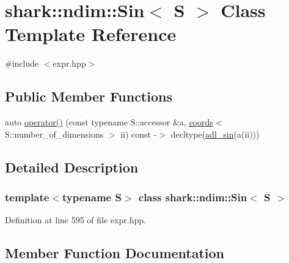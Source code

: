\hypertarget{classshark_1_1ndim_1_1_sin}{}\section{shark\+:\+:ndim\+:\+:Sin$<$ S $>$ Class Template Reference}
\label{classshark_1_1ndim_1_1_sin}


{\ttfamily \#include $<$expr.\+hpp$>$}

\subsection*{Public Member Functions}
\begin{DoxyCompactItemize}
\item 
auto \hyperlink{classshark_1_1ndim_1_1_sin_aa8853d13b3d3095ee7ca6518254399f6}{operator()} (const typename S\+::accessor \&a, \hyperlink{structshark_1_1ndim_1_1coords}{coords}$<$ S\+::number\+\_\+of\+\_\+dimensions $>$ ii) const -\/$>$ decltype(\hyperlink{namespaceshark_a64eebbcdfd6c5bd1d6358a87dae2a26f}{adl\+\_\+sin}(a(ii)))
\end{DoxyCompactItemize}


\subsection{Detailed Description}
\subsubsection*{template$<$typename S$>$\newline
class shark\+::ndim\+::\+Sin$<$ S $>$}



Definition at line 595 of file expr.\+hpp.



\subsection{Member Function Documentation}
\hypertarget{classshark_1_1ndim_1_1_sin_aa8853d13b3d3095ee7ca6518254399f6}{}\label{classshark_1_1ndim_1_1_sin_aa8853d13b3d3095ee7ca6518254399f6} 
